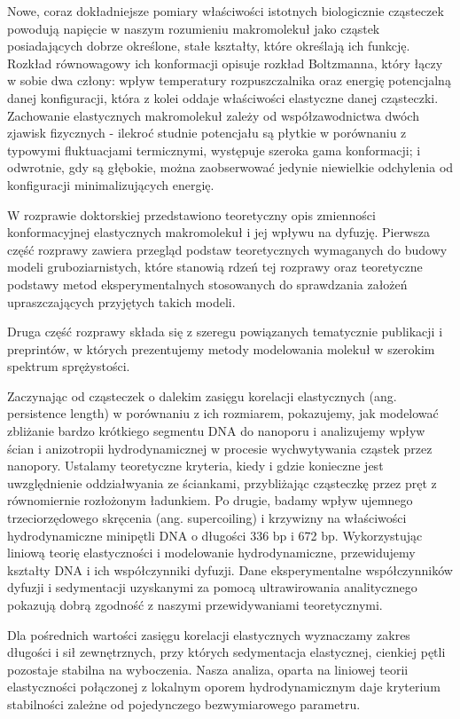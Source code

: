 Nowe, coraz dokładniejsze pomiary właściwości istotnych biologicznie cząsteczek powodują napięcie w naszym rozumieniu makromolekuł jako cząstek posiadających dobrze określone, stałe kształty, które określają ich funkcję.
Rozkład równowagowy ich konformacji opisuje rozkład Boltzmanna, który łączy w sobie dwa człony: wpływ temperatury rozpuszczalnika oraz energię potencjalną danej konfiguracji, która z kolei oddaje właściwości elastyczne danej cząsteczki.
Zachowanie elastycznych makromolekuł zależy od współzawodnictwa dwóch zjawisk fizycznych - ilekroć studnie potencjału są płytkie w porównaniu z typowymi fluktuacjami termicznymi, występuje szeroka gama konformacji; i odwrotnie, gdy są głębokie, można zaobserwować jedynie niewielkie odchylenia od konfiguracji minimalizujących energię.

W rozprawie doktorskiej przedstawiono teoretyczny opis zmienności konformacyjnej elastycznych makromolekuł i jej wpływu na dyfuzję.
Pierwsza część rozprawy zawiera przegląd podstaw teoretycznych wymaganych do budowy modeli gruboziarnistych, które stanowią rdzeń tej rozprawy oraz teoretyczne podstawy metod eksperymentalnych stosowanych do sprawdzania założeń upraszczających przyjętych takich modeli.

Druga część rozprawy składa się z szeregu powiązanych tematycznie publikacji i preprintów, w których prezentujemy metody modelowania molekuł w szerokim spektrum sprężystości.

Zaczynając od cząsteczek o dalekim zasięgu korelacji elastycznych (ang.
persistence length) w porównaniu z ich rozmiarem, pokazujemy, jak modelować zbliżanie bardzo krótkiego segmentu DNA do nanoporu i analizujemy wpływ ścian i anizotropii hydrodynamicznej w procesie wychwytywania cząstek przez nanopory.
Ustalamy teoretyczne kryteria, kiedy i gdzie konieczne jest uwzględnienie oddziałwyania ze ściankami, przybliżając cząsteczkę przez pręt z równomiernie rozłożonym ładunkiem.
Po drugie, badamy wpływ ujemnego trzeciorzędowego skręcenia (ang.
supercoiling) i krzywizny na właściwości hydrodynamiczne minipętli DNA o długości 336 bp i 672 bp.
Wykorzystując liniową teorię elastyczności i modelowanie hydrodynamiczne, przewidujemy kształty DNA i ich współczynniki dyfuzji.
Dane eksperymentalne współczynników dyfuzji i sedymentacji uzyskanymi za pomocą ultrawirowania analitycznego pokazują dobrą zgodność z naszymi przewidywaniami teoretycznymi.

Dla pośrednich wartości zasięgu korelacji elastycznych wyznaczamy zakres długości i sił zewnętrznych, przy których sedymentacja elastycznej, cienkiej pętli pozostaje stabilna na wyboczenia.
Nasza analiza, oparta na liniowej teorii elastyczności połączonej z lokalnym oporem hydrodynamicznym daje kryterium stabilności zależne od pojedynczego bezwymiarowego parametru.

